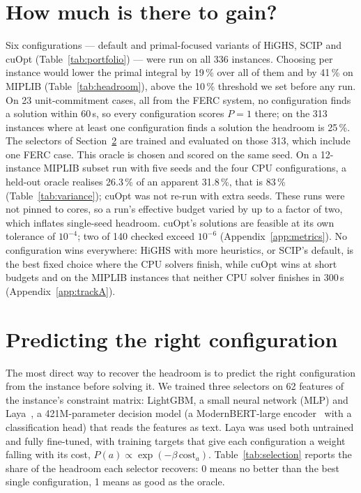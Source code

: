 \documentclass[11pt]{article}
\begin{document}
\section{How much is there to gain?}\label{sec:headroom}
Six configurations --- default and primal-focused variants of HiGHS, SCIP and cuOpt (Table~\ref{tab:portfolio}) ---
were run on all 336 instances. Choosing per instance would lower the primal integral by 19\,\% over all of them and
by 41\,\% on MIPLIB (Table~\ref{tab:headroom}), above the 10\,\% threshold we set before any run. On 23 unit-commitment
cases, all from the FERC system, no configuration finds a solution within 60\,s, so every configuration scores $P=1$
there; on the 313 instances where at least one configuration finds a solution the headroom is 25\,\%. The selectors of
Section~\ref{sec:predict} are trained and evaluated on those 313, which include one FERC case. This oracle is chosen
and scored on the same seed. On a 12-instance MIPLIB subset run with five seeds and the four CPU configurations, a
held-out oracle realises 26.3\,\% of an apparent 31.8\,\%, that is 83\,\% (Table~\ref{tab:variance}); cuOpt was not
re-run with extra seeds. These runs were not pinned to cores, so a run's effective budget varied by up to a factor of
two, which inflates single-seed headroom. cuOpt's solutions are feasible at its own tolerance of $10^{-4}$; two of 140
checked exceed $10^{-6}$ (Appendix~\ref{app:metrics}). No configuration wins everywhere: HiGHS with more
heuristics, or SCIP's default, is the best fixed choice where the CPU solvers finish, while cuOpt wins at short
budgets and on the MIPLIB instances that neither CPU solver finishes in 300\,s (Appendix~\ref{app:trackA}).


\section{Predicting the right configuration}\label{sec:predict}
The most direct way to recover the headroom is to predict the right configuration from the instance before solving
it. We trained three selectors on 62 features of the instance's constraint matrix: LightGBM, a small neural network
(MLP) and Laya~\citep{laya2026}, a 421M-parameter decision model (a ModernBERT-large
encoder~\citep{warner2025modernbert} with a classification head) that reads the features as text. Laya was used both
untrained and fully fine-tuned, with training targets that give each configuration a weight falling with its cost,
$P(a)\propto\exp(-\beta\,\mathrm{cost}_a)$. Table~\ref{tab:selection} reports the share of the headroom each selector
recovers: 0 means no better than the best single configuration, 1 means as good as the oracle.
\end{document}
